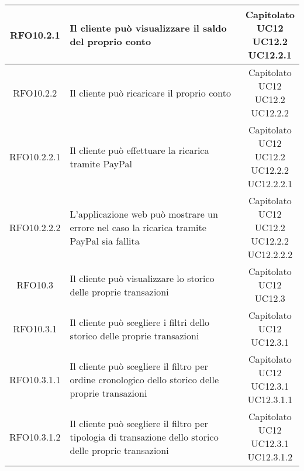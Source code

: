 \begin{longtable}{|c|p{8cm}|c|}
\hypertarget{RFO10.2.1}{RFO10.2.1} & Il cliente può visualizzare il saldo del proprio conto & \makecell*{Capitolato\\UC12\\UC12.2\\UC12.2.1} \\
\hline
\hypertarget{RFO10.2.2}{RFO10.2.2} & Il cliente può ricaricare il proprio conto & \makecell*{Capitolato\\UC12\\UC12.2\\UC12.2.2} \\
\hline

\hypertarget{RFO10.2.2.1}{RFO10.2.2.1} & Il cliente può effettuare la ricarica tramite PayPal & \makecell*{Capitolato\\UC12\\UC12.2\\UC12.2.2\\UC12.2.2.1} \\
\hline

\hypertarget{RFO10.2.2.2}{RFO10.2.2.2} & L'applicazione web può mostrare un errore nel caso la ricarica tramite PayPal sia fallita & \makecell*{Capitolato\\UC12\\UC12.2\\UC12.2.2\\UC12.2.2.2} \\
\hline

\hypertarget{RFO10.3}{RFO10.3} & Il cliente può visualizzare lo storico delle proprie transazioni & \makecell*{Capitolato\\UC12\\UC12.3} \\
\hline

\hypertarget{RFO10.3.1}{RFO10.3.1} & Il cliente può scegliere i filtri dello storico delle proprie transazioni & \makecell*{Capitolato\\UC12\\UC12.3.1} \\
\hline

\hypertarget{RFO10.3.1.1}{RFO10.3.1.1} & Il cliente può scegliere il filtro per ordine cronologico dello storico delle proprie transazioni & \makecell*{Capitolato\\UC12\\UC12.3.1\\UC12.3.1.1} \\
\hline
\hypertarget{RFO10.3.1.2}{RFO10.3.1.2} & Il cliente può scegliere il filtro per tipologia di transazione dello storico delle proprie transazioni & \makecell*{Capitolato\\UC12\\UC12.3.1\\UC12.3.1.2} \\
\hline


\end{longtable}
